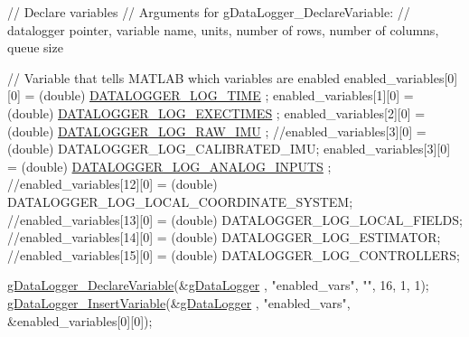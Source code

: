 \begin{DoxyCode}
{        \textcolor{comment}{// Declare variables}
        \textcolor{comment}{// Arguments for gDataLogger\_DeclareVariable:}
        \textcolor{comment}{// datalogger pointer, variable name, units, number of rows, number of
       columns, queue size}

        \textcolor{comment}{// Variable that tells MATLAB which variables are enabled}
        enabled\_variables[0][0] = (double) \hyperlink{datalogger_01_07Caio-PC's_01conflicted_01copy_012012-11-23_08_8h_a9796dd7063d48a850456a4542c5a5fb5}{DATALOGGER\_LOG\_TIME}
      ;
    enabled\_variables[1][0] = (double) \hyperlink{datalogger_01_07Caio-PC's_01conflicted_01copy_012012-11-23_08_8h_ade62d89afc68e01d78fa75ae491a9980}{DATALOGGER\_LOG\_EXECTIMES}
      ;
    enabled\_variables[2][0] = (double) \hyperlink{datalogger_01_07Caio-PC's_01conflicted_01copy_012012-11-23_08_8h_a1c623aa143d8b2e0d507e23425a02275}{DATALOGGER\_LOG\_RAW\_IMU}
      ;
    \textcolor{comment}{//enabled\_variables[3][0] = (double) DATALOGGER\_LOG\_CALIBRATED\_IMU;}
    enabled\_variables[3][0] = (double) \hyperlink{datalogger_01_07Caio-PC's_01conflicted_01copy_012012-11-23_08_8h_adb4db87329e3e60d7824a86d8a4576d9}{DATALOGGER\_LOG\_ANALOG\_INPUTS}
      ;
    \textcolor{comment}{//enabled\_variables[12][0] = (double)
       DATALOGGER\_LOG\_LOCAL\_COORDINATE\_SYSTEM;}
    \textcolor{comment}{//enabled\_variables[13][0] = (double) DATALOGGER\_LOG\_LOCAL\_FIELDS;}
    \textcolor{comment}{//enabled\_variables[14][0] = (double) DATALOGGER\_LOG\_ESTIMATOR;}
    \textcolor{comment}{//enabled\_variables[15][0] = (double) DATALOGGER\_LOG\_CONTROLLERS;}

    \hyperlink{gdatalogger_8c_a3f8f2b3c3f5edc72c3a1887965a544c1}{gDataLogger\_DeclareVariable}(&\hyperlink{datalogger_01_07Caio-PC's_01conflicted_01copy_012012-11-23_08_8c_abe3b9c2c4e21e79c7b046b5986d13acc}{gDataLogger}
      , \textcolor{stringliteral}{"enabled\_vars"}, \textcolor{stringliteral}{""}, 16, 1, 1);
    \hyperlink{gdatalogger_8c_a32674e7c2afa8b78e99a0070cf4bcaf9}{gDataLogger\_InsertVariable}(&\hyperlink{datalogger_01_07Caio-PC's_01conflicted_01copy_012012-11-23_08_8c_abe3b9c2c4e21e79c7b046b5986d13acc}{gDataLogger}
      , \textcolor{stringliteral}{"enabled\_vars"}, &enabled\_variables[0][0]);

}
\end{DoxyCode}
